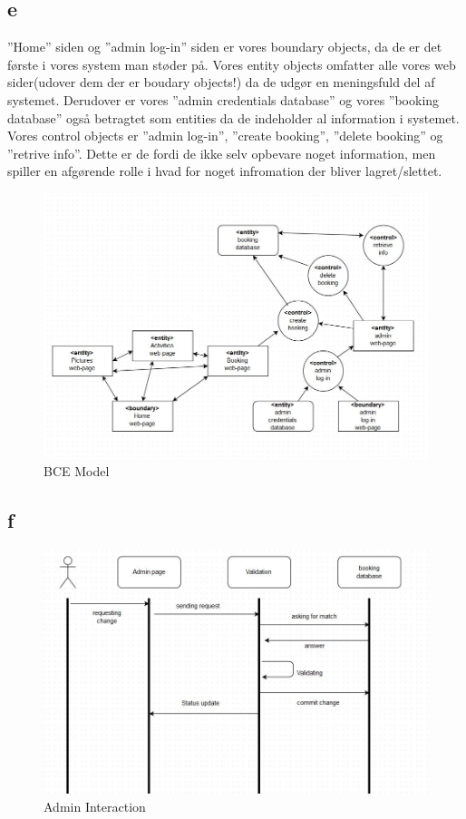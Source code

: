 \documentclass[12pt,a4paper]{article}
\begin{document}
\subsection{e}
”Home” siden og ”admin log-in” siden er vores  boundary objects, da de er det første i vores system man støder på.
Vores entity objects omfatter alle vores web sider(udover dem der er boudary objects!) da de udgør en meningsfuld del af systemet. Derudover er vores ”admin credentials database” og vores ”booking database” også betragtet som entities da de indeholder al information i systemet.
Vores control objects er ”admin log-in”, ”create booking”, ”delete booking” og ”retrive info”. Dette er de fordi de ikke selv opbevare noget information, men spiller en afgørende rolle i hvad for noget infromation der bliver lagret/slettet. \\
\begin{figure}[H]
\includegraphics[scale=0.6]{BCE.jpg}
\caption{BCE Model}
\end{figure}

\subsection{f}

\begin{figure}[H]
\includegraphics[scale=0.4]{adminInteraction.jpg}
\caption{Admin Interaction}
\end{figure}
\end{document}
